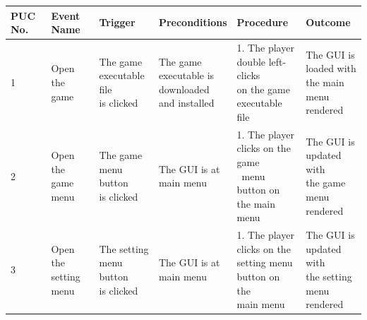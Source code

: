 \documentclass[12pt, titlepage]{article}
\begin{document}
\FloatBarrier
\begin{center}
\begin{longtable}[!bpht]{|m{0.9cm}|m{2.6cm}|m{2.6cm}|m{2.7cm}|m{3.2cm}|m{2.7cm}|}\hline

\textbf{PUC No.} & \textbf{Event Name} & \textbf{Trigger} & \textbf{Preconditions} & \textbf{Procedure} & \textbf{Outcome}\\\hline
1 & \makecell[ml]{Open the\\ game} & \makecell[ml]{The game\\ executable file\\ is clicked} & \makecell[ml]{The game\\ executable is\\ downloaded\\ and installed} & \makecell[ml]{1. The player\\ double left-clicks\\ on the game\\ executable file} & \makecell[ml]{The GUI is\\ loaded with\\ the main menu\\ rendered}\\\hline

2 & \makecell[ml]{Open the\\ game menu} & \makecell[ml]{The game\\ menu button\\ is clicked} & \makecell[ml]{The GUI is at\\ main menu} & \makecell[ml]{1. The player\\ clicks on the game\\\ menu button on\\ the main menu} & \makecell[ml]{The GUI is\\ updated with\\ the game menu\\ rendered}\\\hline

3 & \makecell[ml]{Open the\\ setting menu} & \makecell[ml]{The setting\\ menu button\\ is clicked} & \makecell[ml]{The GUI is at\\ main menu} & \makecell[ml]{1. The player\\ clicks on the\\ setting menu\\ button on the\\ main menu} & \makecell[ml]{The GUI is\\ updated with\\ the setting\\ menu rendered}\\\hline


\end{longtable}
\end{center}
\end{document}
